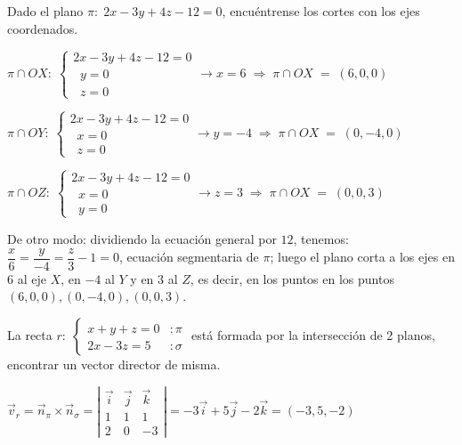  \begin{ejre} 
Dado el plano $\pi:\; 2x-3y+4z-12=0$, encuéntrense los cortes con los ejes coordenados.	
\end{ejre}
\begin{proofw}\renewcommand{\qedsymbol}{$\diamond$}
	$\pi \cap OX: \; \begin{cases} 2x-3y+4z-12=0\\\;\;y=0\\\;\; z=0 \end{cases} \to x=6 \;\Rightarrow \; \pi \cap OX \; =\; (6,0,0)$
	
	\noindent $\pi \cap OY: \; \begin{cases} 2x-3y+4z-12=0\\\;\;x=0\\\;\; z=0 \end{cases} \to y=-4 \;\Rightarrow \; \pi \cap OX \; =\; (0,-4,0)$
	
	\noindent $\pi \cap OZ: \; \begin{cases} 2x-3y+4z-12=0\\\;\;x=0\\\;\; y=0 \end{cases} \to z=3 \;\Rightarrow \; \pi \cap OX \; =\; (0,0,3)$
	


\noindent \textcolor{gris}{De otro modo: dividiendo la ecuación general por $12$, tenemos: $\dfrac{x}{6}=\dfrac{y}{-4}=\dfrac{z}{3}-1=0$, ecuación segmentaria de $\pi$; luego el plano corta a los ejes en $6$ al eje $X$, en $-4$ al $Y$ y en $3$ al $Z$, es decir, en los puntos en los puntos $(6,0,0),  (0,-4,0) , (0,0,3)$.}
\end{proofw}


\begin{ejre}
La recta $r: \; \begin{cases} x+y+z=0 &:\pi\\2x-3z=5 &:\sigma \end{cases}$ está formada por la intersección de 2 planos, encontrar un vector director de misma.	
\end{ejre}
\begin{proofw}\renewcommand{\qedsymbol}{$\diamond$}
	
	$\vec v_r =\vec n_{\pi} \times \vec n_{\sigma}=\left| \begin{matrix} \vec i& \vec j& \vec k \\ 1&1&1 \\ 2 &0 &-3 \end{matrix} \right| =-3\vec i+5 \vec j -2 \vec k=(-3,5,-2)$
	
\end{proofw}

